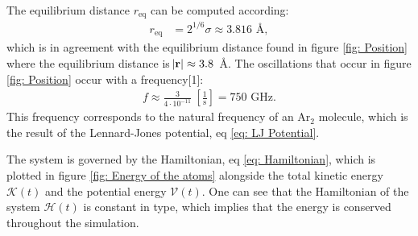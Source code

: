 \documentclass[a4paper]{article}
\newcommand{\newparagraph}{\vspace{.5cm}\noindent}
\begin{document}
The equilibrium distance $r_{\text{eq}}$ can be computed according:
\begin{align*}
    r_{\text{eq}} &= 2^{1/6}\sigma \approx 3.816\text{ Å},
\end{align*}which is in agreement with the equilibrium distance found in figure \ref{fig: Position} where the equilibrium distance is $\abs{\mathbf{r}} \approx 3.8$~Å.
The oscillations that occur in figure \ref{fig: Position} occur with a frequency[1]:
\begin{align*}
    f \approx \frac{3}{4\cdot 10^{-11}}~\left[\frac{1}{\text{s}}\right] = 750 \text{ GHz}.
\end{align*}This frequency corresponds to the natural frequency of an $\text{Ar}_2$ molecule, which is the result of the Lennard-Jones potential, eq \eqref{eq: LJ Potential}.

\newparagraph
The system is governed by the Hamiltonian, eq \eqref{eq: Hamiltonian}, which is plotted in figure \ref{fig: Energy of the atoms} alongside the total kinetic energy $\mathcal{K}(t)$ and the potential energy $\mathcal{V}(t)$.
One can see that the Hamiltonian of the system $\mathcal{H}(t)$ is constant in type, which implies that the energy is conserved throughout the simulation.
\end{document}
